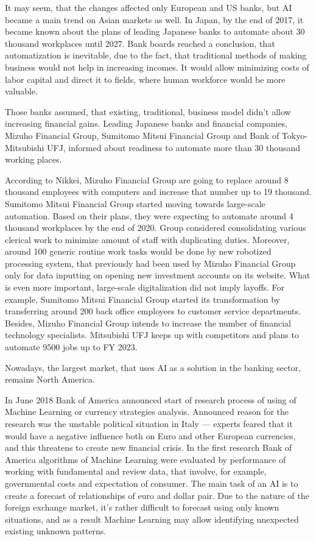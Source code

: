 It may seem, that the changes affected only European and US banks, but AI became a main trend on Asian markets as well.
In Japan, by the end of 2017, it became known about the plans of leading Japanese banks to automate about 30 thousand workplaces until 2027.
Bank boards reached a conclusion, that automatization is inevitable, due to the fact, that traditional methods of making business would not help in increasing incomes.
It would allow minimizing costs of labor capital and direct it to fields, where human workforce would be more valuable.

Those banks assumed, that existing, traditional, business model didn't allow increasing financial gains.
Leading Japanese banks and financial companies, Mizuho Financial Group, Sumitomo Mitsui Financial Group and Bank of Tokyo-Mitsubishi UFJ, informed about readiness to automate more than 30 thousand working places. 
\cite{nikkei_30000_jobs}

According to Nikkei, Mizuho Financial Group are going to replace around 8 thousand employees with computers and increase that number up to 19 thousand.
Sumitomo Mitsui Financial Group started moving towards large-scale automation.
Based on their plans, they were expecting to automate around 4 thousand workplaces by the end of 2020.
Group considered consolidating various clerical work to minimize amount of staff with duplicating duties.
Moreover, around 100 generic routine work tasks would be done by new robotized processing system, that previously had been used by Mizuho Financial Group only for data inputting on opening new investment accounts on its website.
What is even more important, large-scale digitalization did not imply layoffs.
For example, Sumitomo Mitsui Financial Group started its transformation by transferring around 200 back office employees to customer service departments.
Besides, Mizuho Financial Group intends to increase the number of financial technology specialists.
Mitsubishi UFJ keeps up with competitors and plans to automate 9500 jobs up to FY 2023. \cite{mufj_digital_strategy}


Nowadays, the largest market, that uses AI as a solution in the banking sector, remains North America.

In June 2018 Bank of America announced start of research process of using of Machine Learning or currency strategies analysis.
Announced reason for the research was the unstable political situation in Italy — experts feared that it would have a negative influence both on Euro and other European currencies, and this threatens to create new financial crisis.
In the first research Bank of America algorithms of Machine Learning were evaluated by performance of working with fundamental and review data, that involve, for example, governmental costs and expectation of consumer.
The main task of an AI is to create a forecast of relationships of euro and dollar pair.
Due to the nature of the foreign exchange market, it’s rather difficult to forecast using only known situations, and as a result Machine Learning may allow identifying unexpected existing unknown patterns.
\cite{bank_of_america_ai}

